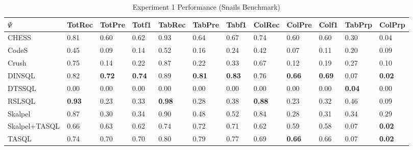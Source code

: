\begin{table}
\caption{Experiment 1 Performance (Snails Benchmark)}
\label{tab:exp1-snails}
\begin{tabular}{llllllllllll}
\toprule
$\Psi$ & TotRec & TotPre & Totf1 & TabRec & TabPre & Tabf1 & ColRec & ColPre & Colf1 & TabPrp & ColPrp \\
\midrule
CHESS & 0.81 & 0.60 & 0.62 & 0.93 & 0.64 & 0.67 & 0.74 & 0.60 & 0.60 & 0.30 & 0.04 \\
CodeS & 0.45 & 0.09 & 0.14 & 0.52 & 0.16 & 0.24 & 0.42 & 0.07 & 0.11 & 0.20 & 0.09 \\
Crush & 0.75 & 0.14 & 0.22 & 0.87 & 0.22 & 0.33 & 0.67 & 0.12 & 0.19 & 0.27 & 0.10 \\
DINSQL & 0.82 & \textbf{0.72} & \textbf{0.74} & 0.89 & \textbf{0.81} & \textbf{0.83} & 0.76 & \textbf{0.66} & \textbf{0.69} & 0.07 & \textbf{0.02} \\
DTSSQL & 0.00 & 0.00 & 0.00 & 0.00 & 0.00 & 0.00 & 0.00 & 0.00 & 0.00 & \textbf{0.04} & 0.00 \\
RSLSQL & \textbf{0.93} & 0.23 & 0.33 & \textbf{0.98} & 0.28 & 0.38 & \textbf{0.88} & 0.23 & 0.32 & 0.46 & 0.09 \\
Skalpel & 0.87 & 0.30 & 0.34 & 0.90 & 0.48 & 0.52 & 0.84 & 0.28 & 0.31 & 0.34 & 0.29 \\
Skalpel+TASQL & 0.66 & 0.63 & 0.62 & 0.74 & 0.72 & 0.71 & 0.62 & 0.59 & 0.58 & 0.07 & \textbf{0.02} \\
TASQL & 0.74 & 0.70 & 0.70 & 0.80 & 0.79 & 0.77 & 0.69 & \textbf{0.66} & 0.66 & 0.07 & \textbf{0.02} \\
\bottomrule
\end{tabular}
\end{table}
